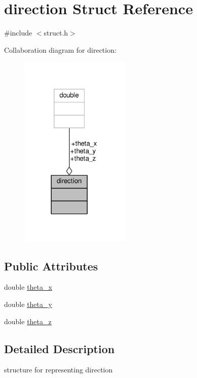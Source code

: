 \hypertarget{structdirection}{}\section{direction Struct Reference}
\label{structdirection}


{\ttfamily \#include $<$struct.\+h$>$}



Collaboration diagram for direction\+:
\nopagebreak
\begin{figure}[H]
\begin{center}
\leavevmode
\includegraphics[width=149pt]{structdirection__coll__graph}
\end{center}
\end{figure}
\subsection*{Public Attributes}
\begin{DoxyCompactItemize}
\item 
double \hyperlink{structdirection_a41c0703c5f8f2ed98a6d388ab7934443}{theta\+\_\+x}
\item 
double \hyperlink{structdirection_a2b953f3c2200ae6d4bfe92ddfeef471d}{theta\+\_\+y}
\item 
double \hyperlink{structdirection_add62492a9c4199b30f0df55ebf7f273b}{theta\+\_\+z}
\end{DoxyCompactItemize}


\subsection{Detailed Description}
structure for representing direction 

